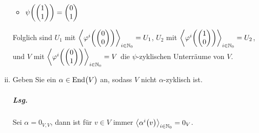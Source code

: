 \documentclass{scrreprt}
\newcommand{\End}{\text{End}}
\begin{document}
\begin{enumerate}[(i)]
\begin{multicols}{2}
\begin{itemize}
  \item$\psi\qty(
      \begin{pmatrix}1\\1\end{pmatrix}
    ) = \begin{pmatrix}0\\1\end{pmatrix}$
  \end{itemize}
  \end{multicols}
  Folglich sind $U_1$ mit $\left\langle
    \varphi^i\qty(\begin{pmatrix}0\\0\end{pmatrix})
  \right\rangle_{i \in \mathbb{N}_0} = U_1$,
  $U_2$ mit $\left\langle
    \varphi^i\qty(\begin{pmatrix}1\\0\end{pmatrix})
  \right\rangle_{i \in \mathbb{N}_0} = U_2$,
  und $V$ mit $\left\langle
    \varphi^i\qty(\begin{pmatrix}0\\1\end{pmatrix})
  \right\rangle_{i \in \mathbb{N}_0} = V$ die $\psi$-zyklischen
  Unterräume von $V$.

\item Geben Sie ein $\alpha \in \End\qty\big(V)$ an, sodass $V$ nicht
  $\alpha$-zyklisch ist.

  \subparagraph{Lsg.} Sei $\alpha = 0_{V, V}$, dann ist für $v \in V$ immer
  $\left\langle \alpha^i\qty\big(v) \right\rangle_{i \in \mathbb{N}_0} = 0_V$.
\end{enumerate}
\end{document}

